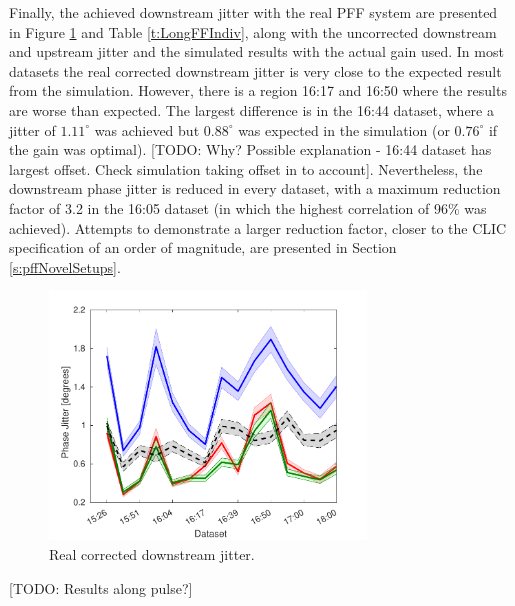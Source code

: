 Finally, the achieved downstream jitter with the real PFF system are presented in Figure \ref{f:longFF_jitDatSet} and Table \ref{t:LongFFIndiv}, along with the uncorrected downstream and upstream jitter and the simulated results with the actual gain used. In most datasets the real corrected downstream jitter is very close to the expected result from the simulation. However, there is a region 16:17 and 16:50 where the results are worse than expected. The largest difference is in the 16:44 dataset, where a jitter of \(1.11^\circ\) was achieved but \(0.88^\circ\) was expected in the simulation (or \(0.76^\circ\) if the gain was optimal). [TODO: Why? Possible explanation - 16:44 dataset has largest offset. Check simulation taking offset in to account]. Nevertheless, the downstream phase jitter is reduced in every dataset, with a maximum reduction factor of 3.2 in the 16:05 dataset (in which the highest correlation of 96\% was achieved). Attempts to demonstrate a larger reduction factor, closer to the CLIC specification of an order of magnitude, are presented in Section \ref{s:pffNovelSetups}.

\begin{figure}
  \centering
  \includegraphics[width=0.75\textwidth]{Figures/feedforward/longFF_jitDatSet}
  \caption{Real corrected downstream jitter.}
  \label{f:longFF_jitDatSet}
\end{figure}


[TODO: Results along pulse?]

